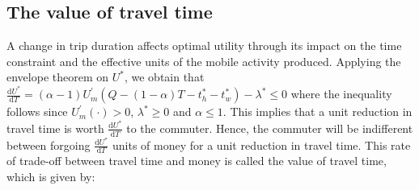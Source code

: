 \documentclass[12pt,a4paper,british]{article}
\theoremstyle{definition}
\theoremstyle{plain}
\theoremstyle{plain}
\begin{document}
\subsection{The value of travel time}

A change in trip duration affects optimal utility through its impact
on the time constraint and the effective units of the mobile activity
produced. Applying the envelope theorem on $U^{\ast}$, we obtain
that $\frac{\mathrm{d}U^{\ast}}{\mathrm{d}T}=\left(\alpha-1\right)U_{m}^{\prime}\left(Q-\left(1-\alpha\right)T-t_{h}^{\ast}-t_{w}^{\ast}\right)-\lambda^{\ast}\leq0$
where the inequality follows since $U_{m}^{\prime}\left(\cdot\right)>0$,
$\lambda^{\ast}\geq0$ and $\alpha\leq1$. This implies that a unit
reduction in travel time is worth $\frac{\mathrm{d}U^{\ast}}{\mathrm{d}T}$
to the commuter. Hence, the commuter will be indifferent between forgoing
$\frac{\mathrm{d}U^{\ast}}{\mathrm{d}T}$ units of money for a unit
reduction in travel time. This rate of trade-off between travel time
and money is called the value of travel time, which is given by:
\end{document}
